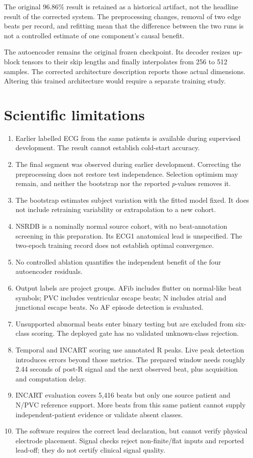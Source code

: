 The original 96.86\% result is retained as a historical artifact, not the
headline result of the corrected system. The preprocessing changes, removal
of two edge beats per record, and refitting mean that the difference between
the two runs is not a controlled estimate of one component's causal benefit.

The autoencoder remains the original frozen checkpoint. Its decoder resizes
up-block tensors to their skip lengths and finally interpolates from 256 to
512 samples. The corrected architecture description reports those actual
dimensions. Altering this trained architecture would require a separate
training study.

\section{Scientific limitations}
\begin{enumerate}
\item Earlier labelled ECG from the same patients is available during
supervised development. The result cannot establish cold-start accuracy.
\item The final segment was observed during earlier development. Correcting
the preprocessing does not restore test independence. Selection optimism may
remain, and neither the bootstrap nor the reported $p$-values removes it.
\item The bootstrap estimates subject variation with the fitted model fixed.
It does not include retraining variability or extrapolation to a new cohort.
\item NSRDB is a nominally normal source cohort, with no beat-annotation
screening in this preparation. Its ECG1 anatomical lead is unspecified.
The two-epoch training record does not establish optimal convergence.
\item No controlled ablation quantifies the independent benefit of the
four autoencoder residuals.
\item Output labels are project groups. AFib includes flutter on normal-like
beat symbols; PVC includes ventricular escape beats; N includes atrial and
junctional escape beats. No AF episode detection is evaluated.
\item Unsupported abnormal beats enter binary testing but are excluded from
six-class scoring. The deployed gate has no validated unknown-class rejection.
\item Temporal and INCART scoring use annotated R peaks. Live peak detection
introduces errors beyond those metrics. The prepared window needs roughly
2.44 seconds of post-R signal and the next observed beat, plus acquisition
and computation delay.
\item INCART evaluation covers 5,416 beats but only one source patient and
N/PVC reference support. More beats from this same patient cannot supply
independent-patient evidence or validate absent classes.
\item The software requires the correct lead declaration, but cannot verify
physical electrode placement. Signal checks reject non-finite/flat inputs and
reported lead-off; they do not certify clinical signal quality.
\end{enumerate}

